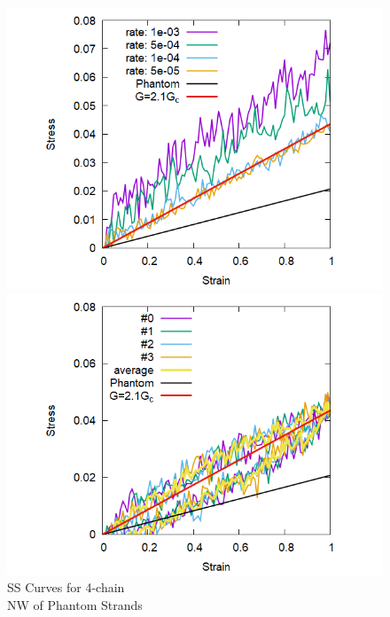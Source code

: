 \documentclass[uplatex,dvipdfmx,a4paper,12pt]{article}
\begin{document}
\begin{figure}[hb]
    \begin{minipage}{0.33\hsize}
        \begin{center}
        \includegraphics[width=\textwidth]{Shear_Random_4chain_N20.png}
        \vspace{1mm}
        \caption{SS Curves for 4-chain \\NW of Phantom Strands}
        \label{fig:deform}
        \end{center}
    \end{minipage}
    \begin{minipage}{0.33\hsize}
        \begin{center}
        \includegraphics[width=\textwidth]{CyclicDeform_4chain_rate_2e-4.png}

\end{center}
\end{minipage}
\end{figure}
\end{document}
